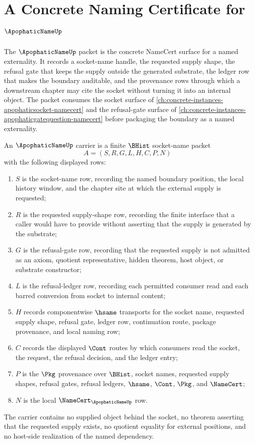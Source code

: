 \chapter{A Concrete Naming Certificate for $\ApophaticNameUp$}
\label{ch:concrete-instances-apophaticname-namecert}

The $\ApophaticNameUp$ packet is the concrete NameCert surface for a named externality. It records a socket-name handle, the requested supply shape, the refusal gate that keeps the supply outside the generated substrate, the ledger row that makes the boundary auditable, and the provenance rows through which a downstream chapter may cite the socket without turning it into an internal object. The packet consumes the socket surface of \autoref{ch:concrete-instances-apophaticsocket-namecert} and the refusal-gate surface of \autoref{ch:concrete-instances-apophaticgatequestion-namecert} before packaging the boundary as a named externality.

\begin{definition}
\label{def:apophatic-name-carrier}
An $\ApophaticNameUp$ carrier is a finite $\BHist$ socket-name packet
$$
A=(S,R,G,L,H,C,P,N)
$$
with the following displayed rows:
\begin{enumerate}
\item $S$ is the socket-name row, recording the named boundary position, the local history window, and the chapter site at which the external supply is requested;
\item $R$ is the requested supply-shape row, recording the finite interface that a caller would have to provide without asserting that the supply is generated by the substrate;
\item $G$ is the refusal-gate row, recording that the requested supply is not admitted as an axiom, quotient representative, hidden theorem, host object, or substrate constructor;
\item $L$ is the refusal-ledger row, recording each permitted consumer read and each barred conversion from socket to internal content;
\item $H$ records componentwise $\hsame$ transports for the socket name, requested supply shape, refusal gate, ledger row, continuation route, package provenance, and local naming row;
\item $C$ records the displayed $\Cont$ routes by which consumers read the socket, the request, the refusal decision, and the ledger entry;
\item $P$ is the $\Pkg$ provenance over $\BHist$, socket names, requested supply shapes, refusal gates, refusal ledgers, $\hsame$, $\Cont$, $\Pkg$, and $\NameCert$;
\item $N$ is the local $\NameCert_{\ApophaticNameUp}$ row.
\end{enumerate}
The carrier contains no supplied object behind the socket, no theorem asserting that the requested supply exists, no quotient equality for external positions, and no host-side realization of the named dependency.
\end{definition}

